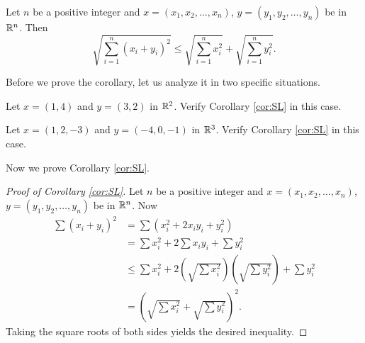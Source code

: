 {\begin{corollary} \label{cor:SL} Let $n$ be a positive integer and $x = (x_1, x_2, \ldots, x_n)$, $y=(y_1, y_2, \ldots, y_n)$ be in $\mathbb{R}^n$. Then 
\[\sqrt{\sum_{i=1}^n (x_i+y_i)^2} \leq \sqrt{\sum_{i=1}^n x_i^2} + \sqrt{\sum_{i=1}^n y_i^2}.\]
\end{corollary}

\begin{activity} Before we prove the corollary, let us analyze it in two specific situations.
	\ba
	\item Let $x=(1,4)$ and $y = (3,2)$ in $\mathbb{R}^2$. Verify Corollary \ref{cor:SL} in this case.
 
	\item Let $x=(1,2, -3)$ and $y = (-4, 0, -1)$ in $\mathbb{R}^3$. Verify Corollary \ref{cor:SL} in this case.

	\ea
\end{activity}

\begin{comment}

\ActivitySolution

	\ba
	\item Here we have 
	\[\sqrt{\sum_{i=1}^2 (x_i+y_i)^2} = \sqrt{4^2+6^2} = \sqrt{52} \approx 7.2\]
	and
	\[\sqrt{\sum_{i=1}^2 x_i^2} + \sqrt{\sum_{i=1}^2 y_i^2} = \sqrt{1+16} + \sqrt{9+4} = \sqrt{17}+\sqrt{13} \approx 7.7.\] 
 
	\item Here we have 
	\[\sqrt{\sum_{i=1}^3 (x_i+y_i)^2} = \sqrt{(-3)^1+2^2+(-4)^2} = \sqrt{29} \approx 5.4\]
	and
	\[\sqrt{\sum_{i=1}^3 x_i^2} + \sqrt{\sum_{i=1}^3 y_i^2} = \sqrt{1+4+9} + \sqrt{16+0+1} = \sqrt{14}+\sqrt{17} \approx 7.8.\] 


	\ea
	
\end{comment}

Now we prove Corollary \ref{cor:SL}.

\begin{proof}[Proof of Corollary \ref{cor:SL}] Let $n$ be a positive integer and $x = (x_1, x_2, \ldots, x_n)$, $y=(y_1, y_2, \ldots, y_n)$ be in $\mathbb{R}^n$. Now
\begin{align*}
\sum \left(x_i+y_i\right)^2 &= \sum \left(x_i^2 +2x_iy_i + y_i^2 \right) \\
	&= \sum x_i^2 + 2\sum x_iy_i + \sum y_i^2 \\
	&\leq \sum x_i^2 + 2\left(\sqrt{\sum x_i^2}\right) \left(\sqrt{\sum y_i^2} \right) + \sum y_i^2 \\
	&= \left(\sqrt{\sum x_i^2} + \sqrt{\sum y_i^2}\right)^2.
\end{align*}
Taking the square roots of both sides yields the desired inequality.
\end{proof}

}
